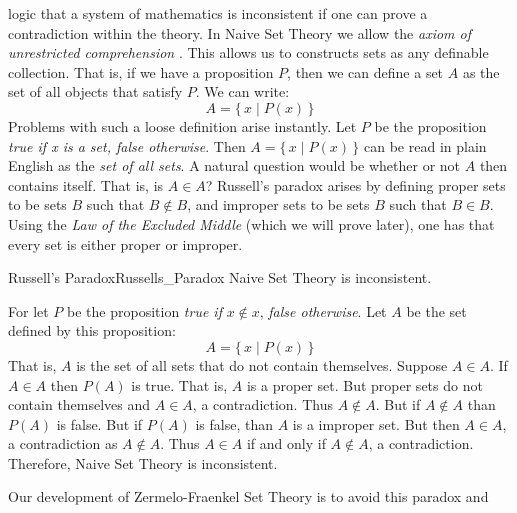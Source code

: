     logic that a system of mathematics is inconsistent if one can prove a
    contradiction within the theory. In Naive Set Theory
    we allow the \textit{axiom of unrestricted comprehension}%
    . This allows us to constructs
    sets as any definable collection. That is, if we have a proposition $P$,
    then we can define a set $A$ as the set of all objects that satisfy $P$.
    We can write:
    \begin{equation}
        A=\big\{\,x\;|\;P(x)\,\big\}
    \end{equation}
    Problems with such a loose definition arise instantly. Let $P$ be the
    proposition \textit{true if x is a set, false otherwise}. Then
    $A=\{\,x\;|\;P(x)\,\}$ can be read in plain English as the
    \textit{set of all sets}. A natural question would be
    whether or not $A$ then contains itself. That is, is $A\in{A}$? Russell's
    paradox arises by defining proper sets to be sets $B$ such that
    $B\notin{B}$, and improper sets to be sets $B$ such that $B\in{B}$. Using
    the \textit{Law of the Excluded Middle}
    (which we will prove later), one has that every set is either proper or
    improper.
    \begin{ftheorem}{Russell's Paradox}{Russells_Paradox}
        Naive Set Theory is inconsistent.
    \end{ftheorem}
    \begin{bproof}
        For let $P$ be the proposition \textit{true if} $x\notin{x}$,
        \textit{false otherwise}. Let $A$ be the set defined by this
        proposition:
        \begin{equation}
            A=\big\{\,x\;|\;P(x)\,\big\}
        \end{equation}
        That is, $A$ is the set of all sets that do not contain themselves.
        Suppose $A\in{A}$. If $A\in{A}$ then $P(A)$ is true. That is, $A$ is a
        proper set. But proper sets do not contain themselves and $A\in{A}$, a
        contradiction. Thus $A\notin{A}$. But if $A\notin{A}$ than $P(A)$ is
        false. But if $P(A)$ is false, than $A$ is a improper set. But then
        $A\in{A}$, a contradiction as $A\notin{A}$. Thus $A\in{A}$ if and only
        if $A\notin{A}$, a contradiction. Therefore, Naive Set Theory is
        inconsistent.
    \end{bproof}
    Our development of Zermelo-Fraenkel Set Theory is to avoid this paradox and
